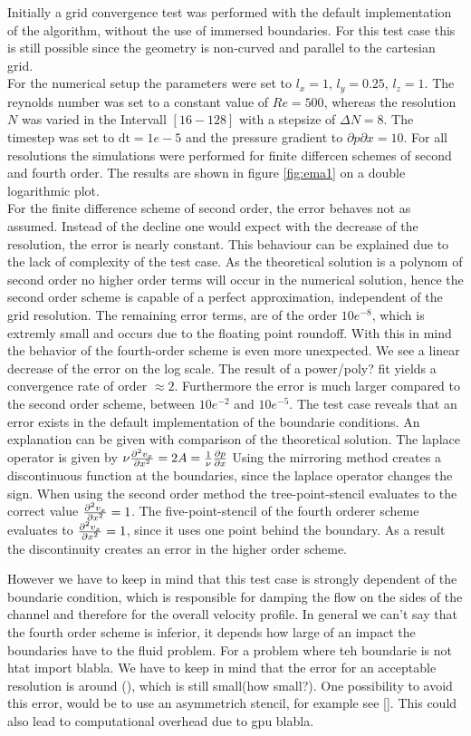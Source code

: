 Initially a grid convergence test was performed with the default implementation of the algorithm, without the use of immersed boundaries.
For this test case this is still possible since the geometry is non-curved and parallel to the cartesian grid.\\
For the  numerical setup the parameters were set to $l_x=1$, $l_y=0.25$, $l_z=1$.
The reynolds number was set to a constant value of $Re=500$, whereas the resolution $N$ was varied in the Intervall $[16 - 128]$ with a stepsize of $\Delta N = 8$.
The timestep was set to $\mathrm{dt}=1e-5$ and the pressure gradient to $\partial p \partial x  = 10$.
For all resolutions the simulations were performed for finite differcen schemes of second and fourth order.
The results are shown in figure \ref{fig:ema1} on a double logarithmic plot.\\
For the finite difference scheme of second order, the error behaves not as assumed.
Instead of the decline one would expect with the decrease of the resolution, the  error is nearly constant.
This behaviour can be explained due to the lack of complexity of the test case. As the theoretical solution is a polynom of second order
no higher order terms will occur in the numerical solution, hence the second order scheme is capable of a perfect approximation, independent of the
grid resolution. The remaining error terms, are of the order $10e^{-8}$, which is extremly small and occurs due to the floating point roundoff.
With this in mind the behavior of the fourth-order scheme is even more unexpected.
We see a linear decrease of the error on the log scale.
The result of a power/poly?  fit yields a convergence rate of order $\approx 2$.
Furthermore the error is much larger compared to the second order scheme, between $10e^{-2}$ and $10e^{-5}$.
The test case reveals that an error exists in the default implementation of the boundarie conditions.
An explanation can be given with comparison of the theoretical solution. The laplace operator is given by
 $ \nu \pdn[^2 v_x]{x^2} = 2A = \frac{1}{\nu}\pdn[p]{x}$
Using the mirroring method creates a discontinuous function at the boundaries, since the laplace operator changes the sign.
When using the second order method the tree-point-stencil evaluates to the correct value $\pdn[^2 v_x]{x^2} = 1$.
The five-point-stencil of the fourth orderer scheme evaluates to $\pdn[^2 v_x]{x^2} = 1$, since it uses one point behind the boundary.
As a result the discontinuity creates an error in the higher order scheme.

However we have to keep in mind that this test case is strongly dependent of the boundarie condition,
which is responsible for damping the flow on the sides of the channel and therefore for the overall velocity profile.
In general we can't say that the fourth order scheme is inferior, it depends how large of an impact
the boundaries have to the fluid problem.
For a problem where teh boundarie is not htat import  blabla.
We have to keep in mind that the error for an acceptable resolution is around (), which is still small(how small?).
One possibility to avoid this error, would be to use an asymmetrich stencil, for example see [].
This could also lead to computational overhead due to gpu blabla.



